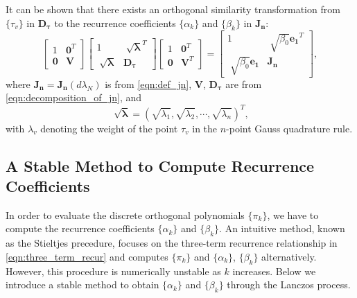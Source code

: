 \documentclass[11pt,letter]{article}
\begin{document}
It can be shown that there exists an orthogonal similarity transformation from $\{\tau_v\}$ in $\mathbf{D_\tau}$ to the recurrence coefficients $\{\alpha_k\}$ and $\{\beta_k\}$ in $\mathbf{J_n}$:
\begin{equation}
\label{eqn:magic_identity}
\begin{bmatrix}1 &\mathbf{0}^T\\ \mathbf{0} & \mathbf{V}\end{bmatrix} \begin{bmatrix}1 &\sqrt[]{\bm{\lambda}}^T\\\sqrt[]{\bm{\lambda}} &\mathbf{D_\tau} \end{bmatrix} 
\begin{bmatrix}1 &\mathbf{0}^T\\ \mathbf{0} & \mathbf{V}^T\end{bmatrix} = \begin{bmatrix}1 & \sqrt[]{\beta_{0}}\mathbf{e_1}^T\\ \sqrt[]{\beta_{0}}\mathbf{e_1} &\mathbf{J_n} \end{bmatrix},
\end{equation}
where $\mathbf{J_n}=\mathbf{J_n}(d\lambda_N)$ is from \eqref{eqn:def_jn}, $\mathbf{V}$, $\mathbf{D_\tau}$ are from \eqref{eqn:decomposition_of_jn}, and 
$$\sqrt[]{\bm{\lambda}}=(\sqrt{\lambda_1},\sqrt{\lambda_2},\cdots,\sqrt{\lambda_n})^T,$$
 with $\lambda_v$ denoting the weight of the point $\tau_v$ in the $n$-point Gauss quadrature rule.\\


\subsection{A Stable Method to Compute Recurrence Coefficients}
In order to evaluate the discrete orthogonal polynomials $\{\pi_k\}$, we have to compute the recurrence coefficients $\{\alpha_k\}$ and $\{\beta_k\}$. An intuitive method, known as the Stieltjes precedure, focuses on the three-term recurrence relationship in \eqref{eqn:three_term_recur} and computes $\{\pi_k\}$ and $\{\alpha_k\}$, $\{\beta_k\}$ alternatively. However, this procedure is numerically unstable as $k$ increases. Below we introduce a stable method to obtain $\{\alpha_k\}$ and $\{\beta_k\}$ through the Lanczos process.
\end{document}
